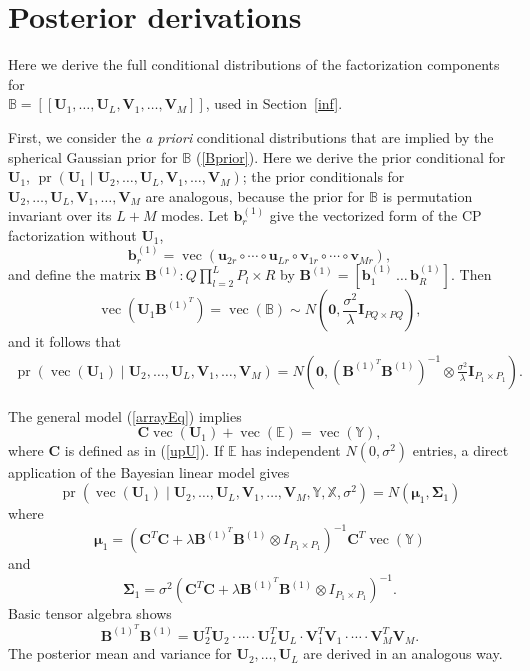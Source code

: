 \documentclass[12pt]{article}
\def\I{\mathbf{I}}
\def\U{\mathbf{U}}
\def\u{\mathbf{u}}
\def\XX{\mathbb{X}}
\def\YY{\mathbb{Y}}
\def\EE{\mathbb{E}}
\def\V{\mathbf{V}}
\def\B{\mathbf{B}}
\def\BB{\mathbb{B}}
\def\B{\mathbf{B}}
\def\b{\mathbf{b}}
\def\C{\mathbf{C}}
\def\v{\mathbf{v}}
\def\mmu{\boldsymbol{\mu}}
\def\SSigma{\boldsymbol{\Sigma}}
\def\tp#1{[\![#1]\!]}
\DeclareMathOperator*{\vect}{vec}
\DeclareMathOperator*{\pr}{pr}
\begin{document}
\section{Posterior derivations} 
\label{appPost}
Here we derive the full conditional distributions of the factorization components for \\$\BB=\tp{\U_1,\hdots,\U_L,\V_1,\hdots,\V_M}$, used in Section~\ref{inf}.  

	First, we consider the \emph{a priori} conditional distributions that are implied by the spherical Gaussian prior for $\BB$ (\ref{Bprior}).   Here we derive the prior conditional for $\U_1$, $\pr(\U_1 \mid \U_2,\hdots,\U_L, \V_1,\hdots,\V_M)$;  the prior conditionals for $\U_2,\hdots,\U_L, \V_1,\hdots,\V_M$ are analogous, because the prior for $\BB$ is permutation invariant over its $L+M$ modes. Let  $\b_r^{(1)}$ give the vectorized form of the CP factorization without $\U_1$,
	\[\b_r^{(1)} = \vect \left(\u_{2r} \circ \cdots \circ \u_{Lr} \circ \v_{1r} \circ \cdots \circ \v_{Mr}\right),\]
  and define the matrix $\B^{(1)}: Q \prod_{l=2}^L P_l \times R$ by $\B^{(1)} = \left[\b_1^{(1)} \, \hdots \, \b_R^{(1)} \right]$.  Then 
\[ \vect \left(\U_1 \B^{(1)^T} \right) = \vect (\BB) \sim N\left(\mathbf{0}, \frac{\sigma^2}{\lambda} \I_{PQ \times PQ}\right), \]   
and it follows that 
\begin{align*}
\pr(\vect(\U_1) \mid \U_2,\hdots,\U_L, \V_1,\hdots,\V_M) = N \left(\mathbf{0}, \left(\B^{(1)^T} \B^{(1)}\right)^{-1} \otimes  \frac{\sigma^2}{\lambda}  \I_{P_1 \times P_1} \right ).
\end{align*}

The general model (\ref{arrayEq}) implies
\[\C \vect(\U_1) + \vect (\EE) = \vect (\YY),  \]
where $\C$ is defined as in (\ref{upU}). If $\EE$ has independent $N(0,\sigma^2)$ entries, a direct application of the Bayesian linear model \citep{lindley1972bayes} gives 
\[\pr(\vect(\U_1) \mid \U_2, \hdots,\U_L, \V_1,\hdots,\V_M, \YY, \XX, \sigma^2) = N(\mmu_1, \SSigma_1)\]
where 
\[\mmu_1 = \left(\C^T\C + \lambda \B^{(1)^T} \B^{(1)} \otimes I_{P_1 \times P_1} \right)^{-1}\C^T \vect(\YY)\]
and 
\[\SSigma_1 = \sigma^2 \left(\C^T\C + \lambda \B^{(1)^T} \B^{(1)} \otimes I_{P_1 \times P_1} \right)^{-1}.\]
Basic tensor algebra shows 
\[\B^{(1)^T} \B^{(1)} = \U_2^T \U_2 \cdot \cdots \cdot \U_L^T \U_L \cdot \V_1^T \V_1 \cdot \cdots \cdot  \V_M^T \V_M.\]
The posterior mean and variance for $\U_2,\hdots,\U_L$ are derived in an analogous way.  
\end{document}
